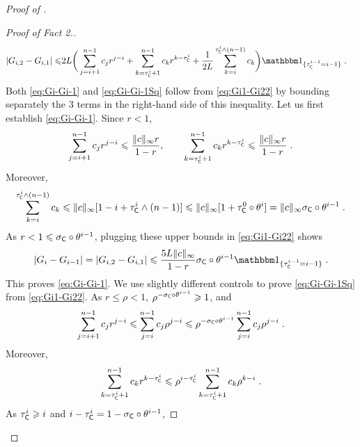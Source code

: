 \documentclass[leqno,11pt,a4paper]{article}
\begin{document}
\begin{proof}[Proof of ]
\begin{proof}[Proof of Fact 2.]
\begin{align}
\label{eq:Gi1-Gi22} |G_{i,2}-G_{i,1}|\leqslant &2L\bigg(\sum_{j=i+1}^{n-1}c_jr^{j-i}+\sum_{k=\tau_{\cC}^i+1}^{n-1}c_kr^{k-\tau_{\cC}^i}+\frac1{2L}\sum_{k=i}^{\tau_{\cC}^i\wedge (n-1)}c_k\bigg)\indiacc{\tau_{\cC}^{i-1}=i-1}\eqsp.
\end{align}
Both \eqref{eq:Gi-Gi-1} and \eqref{eq:Gi-Gi-1Sq} follow from \eqref{eq:Gi1-Gi22} by bounding separately the $3$ terms in the right-hand side of this inequality.
Let us first establish \eqref{eq:Gi-Gi-1}.
Since $r<1$,
\[
\sum_{j=i+1}^{n-1}c_jr^{j-i}\leqslant \frac{\|c\|_\infty r}{1-r},\qquad \sum_{k=\tau_{\mathsf{C}}^i+1}^{n-1}c_kr^{k-\tau_{\mathsf{C}}^i}\leqslant \frac{\|c\|_\infty r}{1-r}\;.
\]
Moreover,
\[
\sum_{k=i}^{\tau_{\mathsf{C}}^i\wedge (n-1)}c_k\leqslant \|c\|_{\infty}[1-i+\tau_{\mathsf{C}}^i\wedge (n-1) ]\leqslant \|c\|_{\infty}[1+\tau_{\mathsf{C}}^0\circ \theta^i]=\|c\|_{\infty}\sigma_{\mathsf{C}}\circ\theta^{i-1}\;.
\]
As $r<1\leqslant \sigma_{\mathsf{C}}\circ\theta^{i-1}$, plugging these upper bounds in \eqref{eq:Gi1-Gi22} shows
\[
|G_{i}-G_{i-1}|=|G_{i,2}-G_{i,1}|\leqslant \frac{5L\|c\|_{\infty}}{1-r}\sigma_{\cC}\circ\theta^{i-1}\indiacc{\tau_{\cC}^{i-1}=i-1}\eqsp.
\]
This proves \eqref{eq:Gi-Gi-1}.
We use slightly different controls to prove \eqref{eq:Gi-Gi-1Sq} from \eqref{eq:Gi1-Gi22}.
As $r\leqslant \rho<1$, $\rho^{-\sigma_{\mathsf{C}}\circ\theta^{i-1}}\geqslant 1$, and
\begin{align}
\label{eq:Step1Var} \sum_{j=i+1}^{n-1}c_jr^{j-i}\leqslant \sum_{j=i}^{n-1}c_j\rho^{j-i}\leqslant \rho^{-\sigma_{\mathsf{C}}\circ\theta^{i-1}}\sum_{j=i}^{n-1}c_j\rho^{j-i}\;.
\end{align}
Moreover,
\begin{align*}
 \sum_{k=\tau_{\mathsf{C}}^i+1}^{n-1}c_kr^{k-\tau_{\mathsf{C}}^i}\leqslant\rho^{i-\tau_{\mathsf{C}}^i}\sum_{k=\tau_{\mathsf{C}}^i+1}^{n-1}c_k\rho^{k-i}\;.
\end{align*}
As $\tau_{\mathsf{C}}^i\geqslant i$ and $i-\tau_{\mathsf{C}}^i=1-\sigma_{\mathsf{C}}\circ\theta^{i-1}$,

\end{proof}
\end{proof}
\end{document}
